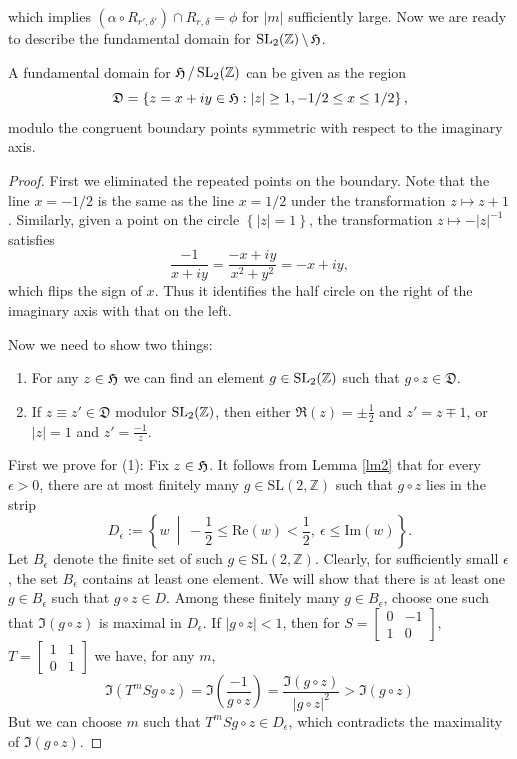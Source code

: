which implies $(\alpha \circ R_{r',\delta'}) \cap R_{r,\delta} = \phi$ for $|m|$ sufficiently large.
Now we are ready to describe the fundamental domain for $\operatorname{SL_2(\mathbb{Z})} \backslash \operatorname{\mathfrak{H}}$.
\begin{prop}\label{prop2}
  A fundamental domain for $\operatorname{\mathfrak{H}}/ \operatorname{SL_2(\mathbb{Z})}$ can be given as the region
  \[\mathfrak{D} = \left\lbrace z=x+iy \in \operatorname{\mathfrak{H}}: |z| \ge 1,-1/2 \le x \le 1/2 \right\rbrace ,\]
  modulo the congruent boundary points symmetric with respect to the imaginary axis.
\end{prop}
\begin{proof}
  First we eliminated the repeated points on the boundary. Note that the line $x = -1/2$ is the same as
  the line $x=1/2$ under the transformation $z \mapsto z+1$. Similarly, given a point on the circle
  $\left\lbrace |z|=1\right\rbrace$, the transformation $z \mapsto -|z|^{-1}$ satisfies
  \[\dfrac{-1}{x+iy} = \dfrac{-x+iy}{x^2+y^2}=-x+iy,\]
  which flips the sign of $x$. Thus it identifies the half circle on the right of the imaginary axis with that on the left.

  Now we need to show two things:
  \begin{enumerate}
    \item For any $z \in \operatorname{\mathfrak{H}}$ we can find an element $g \in \operatorname{SL_2(\mathbb{Z})}$ such that $g\circ z \in \mathfrak{D}$.
    \item If $z \equiv z' \in \mathfrak{D}$ modulor $\operatorname{SL_2(\mathbb{Z})}$, then either $\Re(z)=\pm\frac{1}{2}$ and $z'=z\mp 1$, or
          $|z|=1$ and $z' = \frac{-1}{z} $.
  \end{enumerate}
  First we prove for (1): Fix $z \in \operatorname{\mathfrak{H}}$. It follows from Lemma \ref{lm2} that for every $\epsilon > 0$, there are at most finitely many $g \in \mathrm{SL}(2, \mathbb{Z})$ such that $g \circ z$ lies in the strip
  \[
    D_{\epsilon} := \left\{ w \ \middle|\ -\frac{1}{2} \leq \mathrm{Re}(w) < \frac{1}{2},\ \epsilon \leq \mathrm{Im}(w) \right\}.
  \]
  Let $B_{\epsilon}$ denote the finite set of such $g \in \mathrm{SL}(2, \mathbb{Z})$.
  Clearly, for sufficiently small $\epsilon$, the set $B_{\epsilon}$ contains at least one element. We will show that there is at least one $g \in B_{\epsilon}$ such that $g \circ z \in D$. Among these finitely many $g \in B_{\epsilon}$, choose one such that $\Im(g \circ z)$ is maximal in $D_{\epsilon}$.
  If $|g \circ z| < 1$, then for $S = \begin{bmatrix} 0 & -1 \\ 1 & 0 \end{bmatrix}$, $T=\begin{bmatrix} 1 & 1 \\ 0 & 1 \end{bmatrix}$
  we have, for any $m$,
  \[\Im\left( T^mS g \circ z \right)= \Im\left(\dfrac{-1}{g\circ z}\right)=\dfrac{\Im(g\circ z)}{|g\circ z|^2} > \Im(g\circ z)\]
  But we can choose $m$ such that $T^m S g\circ z \in D_\epsilon$, which contradicts the maximality of $\Im(g\circ z)$.


\end{proof}

